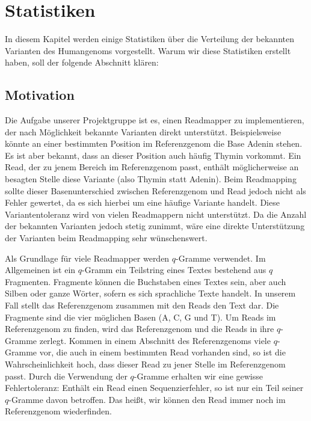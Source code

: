 \chapter{Statistiken}
\label{sec:stats}

In diesem Kapitel werden einige Statistiken über die Verteilung der bekannten Varianten des Humangenoms vorgestellt. Warum wir diese Statistiken erstellt haben, soll der folgende Abschnitt klären:

\section{Motivation}
\label{sec:stats:motivation}
Die Aufgabe unserer Projektgruppe ist es, einen Readmapper zu implementieren, der nach Möglichkeit bekannte Varianten direkt unterstützt. Beispielsweise könnte an einer bestimmten Position im Referenzgenom die Base Adenin stehen. Es ist aber bekannt, dass an dieser Position auch häufig Thymin vorkommt. Ein Read, der zu jenem Bereich im Referenzgenom passt, enthält möglicherweise an besagten Stelle diese Variante (also Thymin statt Adenin). Beim Readmapping sollte dieser Basenunterschied zwischen Referenzgenom und Read jedoch nicht als Fehler gewertet, da es sich hierbei um eine häufige Variante handelt. Diese Variantentoleranz wird von vielen Readmappern nicht unterstützt. Da die Anzahl der bekannten Varianten jedoch stetig zunimmt, wäre eine direkte Unterstützung der Varianten beim Readmapping sehr wünschenswert.

Als Grundlage für viele Readmapper werden $q$-Gramme verwendet. Im Allgemeinen ist ein $q$-Gramm ein Teilstring eines Textes bestehend aus $q$ Fragmenten. Fragmente können die Buchstaben eines Textes sein, aber auch Silben oder ganze Wörter, sofern es sich sprachliche Texte handelt. In unserem Fall stellt das Referenzgenom zusammen mit den Reads den Text dar. Die Fragmente sind die vier möglichen Basen (A, C, G und T). Um Reads im Referenzgenom zu finden, wird das Referenzgenom und die Reads in ihre $q$-Gramme zerlegt. Kommen in einem Abschnitt des Referenzgenoms viele $q$-Gramme vor, die auch in einem bestimmten Read vorhanden sind, so ist die Wahrscheinlichkeit hoch, dass dieser Read zu jener Stelle im Referenzgenom passt. Durch die Verwendung der $q$-Gramme erhalten wir eine gewisse Fehlertoleranz: Enthält ein Read einen Sequenzierfehler, so ist nur ein Teil seiner $q$-Gramme davon betroffen. Das heißt, wir können den Read immer noch im Referenzgenom wiederfinden. 

